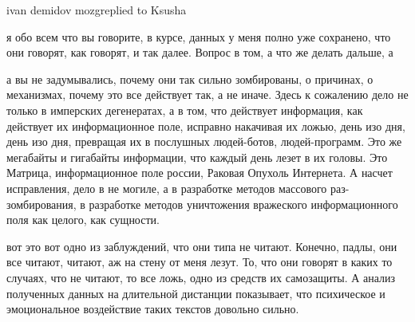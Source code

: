 ivan demidov mozgreplied to Ksusha

я обо всем что вы говорите, в курсе, данных у меня полно уже сохранено, что они
говорят, как говорят, и так далее. Вопрос в том, а что же делать дальше, а

а вы не задумывались, почему они так сильно зомбированы, о причинах, о
механизмах, почему это все действует так, а не иначе. Здесь к сожалению дело не
только в имперских дегенератах, а в том, что действует информация, как
действует их информационное поле, исправно накачивая их ложью, день изо дня,
день изо дня, превращая их в послушных людей-ботов, людей-программ. Это же
мегабайты и гигабайты информации, что каждый день лезет в их головы. Это
Матрица, информационное поле россии, Раковая Опухоль Интернета. А насчет
исправления, дело в не могиле, а в разработке методов массового
раз-зомбирования, в разработке методов уничтожения вражеского информационного
поля как целого, как сущности.

вот это вот одно из заблуждений, что они типа не читают. Конечно, падлы, они
все читают, читают, аж на стену от меня лезут. То, что они говорят в каких то
случаях, что не читают, то все ложь, одно из средств их самозащиты. А анализ
полученных данных на длительной дистанции показывает, что психическое и
эмоциональное воздействие таких текстов довольно сильно.

